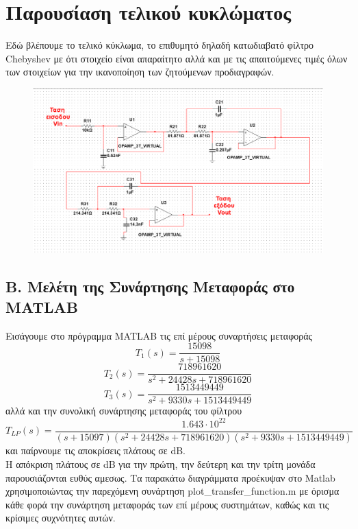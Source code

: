 \documentclass{article}
\begin{document}
{\begin{figure}[h!]
  
 
\end{figure}
\newpage
\section*{Παρουσίαση τελικού κυκλώματος}
   Εδώ βλέπουμε το τελικό κύκλωμα, το επιθυμητό δηλαδή κατωδιαβατό φίλτρο Chebyshev με ότι στοιχείο είναι απαραίτητο αλλά και με τις απαιτούμενες τιμές όλων των στοιχείων για την ικανοποίηση των ζητούμενων προδιαγραφών.
    \begin{figure}[h!]
\centering
 \advance\leftskip-5.1cm
  \includegraphics[width=220mm,scale=2]{telikok.png}
  
  
 
\end{figure} 
\clearpage
\subsection*{B. Μελέτη της Συνάρτησης Μεταφοράς στο MATLAB}
\large{}
Εισάγουμε στο  πρόγραμμα MATLAB τις επί μέρους συναρτήσεις μεταφοράς
 \begin{equation*}
\boxed{T_1(s) = \frac{15098}{s+15098} }
\end{equation*} 
\begin{equation*}
\boxed{T_2(s) = \frac{718961620}{s^2+24428s+718961620}}
\end{equation*}
\begin{equation*}
\boxed{T_3(s) = \frac{1513449449}{s^2+9330s+1513449449}}
\end{equation*}
αλλά και την συνολική συνάρτησης μεταφοράς του φίλτρου 
\begin{equation*}
\boxed{T_{LP}(s) = \frac{1.643 \cdot 10^{22}}{(s+15097)(s^2+24428s+718961620)(s^2+9330s+1513449449)}}
\end{equation*}
και παίρνουμε τις αποκρίσεις πλάτους σε dB. \\ Η απόκριση πλάτους σε dB για την πρώτη, την δεύτερη και την τρίτη μονάδα παρουσιάζονται ευθύς αμεσως. Τα παρακάτω διαγράμματα προέκυψαν στο Matlab χρησιμοποιώντας την παρεχόμενη συνάρτηση plot\_transfer\_function.m με όρισμα κάθε φορά την συνάρτηση μεταφοράς των επί μέρους συστημάτων, καθώς και τις κρίσιμες συχνότητες αυτών. 
\\[2.4\baselineskip]

}
\end{document}
